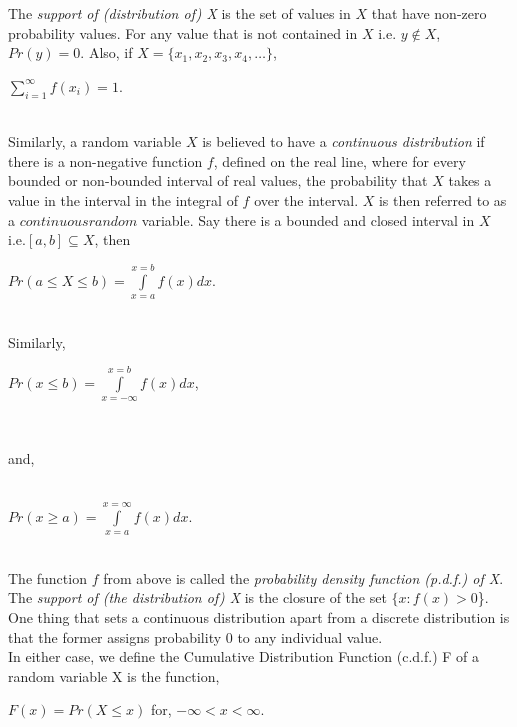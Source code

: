 \documentclass[12pt,twoside]{reedthesis}
\begin{document}
\begin{enumerate}
\begin{enumerate}
The \textit{support of (distribution of) X} is the set of values in $X$ that have non-zero probability values. For any value that is not contained in $X$ i.e. $y \notin X$, $Pr(y) = 0$. Also, if $X = \{x_1, x_2, x_3, x_4, \dotsc \}$, 
\begin{center}
$\sum\limits_{i=1}^{\infty} f(x_i ) = 1$.
\end{center}\\

Similarly, a random variable $X$ is believed to have a \textit{continuous distribution} if there is a non-negative function $f$, defined on the real line, where for every bounded or non-bounded interval of real values, the probability that $X$ takes a value in the interval in the integral of $f$ over the interval. $X$ is then referred to as a $continuous random$ variable. Say there is a bounded and closed interval in $X$ i.e.$[a, b] \subseteq  X$, then 
\begin{center}
$Pr⁡(a≤ X ≤b) = \int\limits_{x=a}^{x=b} f(x)dx $.
\end{center}\\

Similarly, 

\begin{center}
$Pr⁡(x ≤ b)= \int\limits_{x = -\infty}^{x = b} f(x)dx$,\\ 
\end{center}\\

\begin{center}
and,
\end{center}

\begin{center}\\
$Pr⁡(x ≥ a)= \int\limits_{x = a}^{x = \infty} f(x) dx$.
\end{center}\\

The function $f$ from above is called the \textit{probability density function (p.d.f.) of X}. The \textit{support of (the distribution of) X} is the closure of the set $\{ x: f(x) > 0 $\}. One thing that sets a continuous distribution apart from a discrete distribution is that the former assigns probability 0 to any individual value.\\

In either case, we define the Cumulative Distribution Function (c.d.f.) F of a random variable X is the function,
\begin{center}
$F(x) = Pr(X ≤ x)$	for,	$-\infty < x < \infty$.
\end{center}\\


\end{enumerate}
\end{enumerate}
\end{document}
